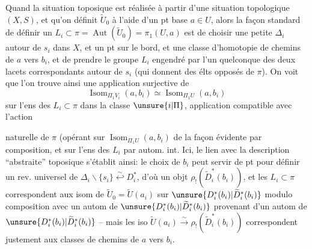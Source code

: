Quand  la situation toposique est réalisée à partir d'une situation topologique \((X,S)\), et qu'on définit \(\widetilde U_0\) à l'aide d'un pt base \(a\in U\), alors la façon standard de définir un \(L_i\subset\pi=\operatorname{Aut}(\widetilde U_0)=\pi_1(U,a)\) est de choisir une petite  \(\Delta_i\) autour de \(s_i\) dans \(X\),
et un pt  sur le bord, et une classe d'homotopie de chemins  de \(a\) vers \(b_i\), et de prendre le groupe \(L_i\) engendré par l'un quelconque des deux lacets correspondants autour de \(s_i\) (qui donnent des  élts opposés de \(\pi\)).
On voit que l'on trouve ainsi une application surjective de
\[
\operatorname{Isom}_{\Pi_1V_i}(a,b_i)\simeq
\operatorname{Isom}_{\Pi_1U}(a,b_i)
\]
 sur l'ens des \(L_i\subset\pi\) dans la classe \(\unsure{i|\Pi}\), application  compatible avec l'action


naturelle de \(\pi\) (opérant sur \(\operatorname{Isom}_{\Pi_1U}(a,b_i)\) de la façon évidente par composition, et sur l'ens des \(L_i\) par autom. int.
 Ici, le  lien avec la description ``abstraite'' toposique s'établit ainsi: le choix de \(b_i\) peut servir de pt  pour définir un rev. universel de \(\Delta_i\smallsetminus\{s_i\}\overset{\sim}{\hookleftarrow}D_i^*\), d'où un objt \(\rho_!(\widetilde D_i^*(b_i))\), et  les \(L_i\subset\pi\) correspondent  aux isom de \(\widetilde U_0=\widetilde U(a_i)\) sur \(\unsure{D_i^*(b_i)|\widetilde D_i^*(b_i)}\) modulo composition avec un autom de \(\unsure{D_i^*(b_i)|\widetilde D_i^*(b_i)}\) provenant d'un autom de \(\unsure{D_i^*(b_i)|\widetilde D_i^*(b_i)}\) -- mais les iso  \(\widetilde U(a_i)\xrightarrow{\sim}\rho_!(\widetilde D_i^*(b_i))\) correspondent justement aux classes de chemins de \(a\) vers \(b_i\).

